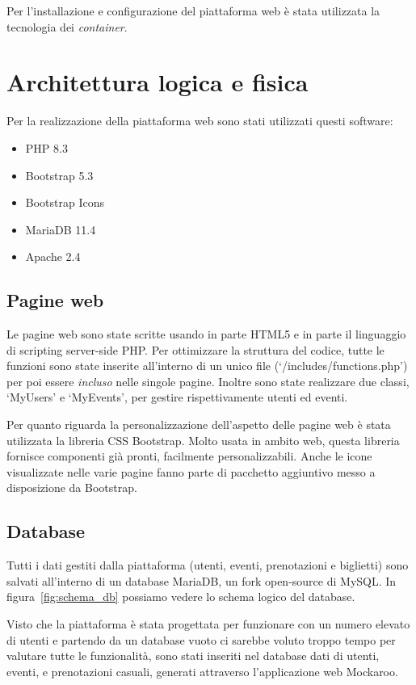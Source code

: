 \documentclass[italian,12pt,a4paper,oneside,final]{report}
\begin{document}
Per l’installazione e configurazione del piattaforma web è stata utilizzata la tecnologia dei \textit{container}.
\newpage
\section{Architettura logica e fisica}
Per la realizzazione della piattaforma web sono stati utilizzati questi software:

\begin{itemize}
	\item PHP 8.3
	\item Bootstrap 5.3
	\item Bootstrap Icons
	\item MariaDB 11.4
	\item Apache 2.4
\end{itemize}

\subsection{Pagine web}
Le pagine web sono state scritte usando in parte HTML5 e in parte il linguaggio di scripting server-side PHP.
Per ottimizzare la struttura del codice, tutte le funzioni sono state inserite all'interno di un unico file \mbox{(`/includes/functions.php')} per poi essere \textit{incluso} nelle singole pagine. 
Inoltre sono state realizzare due classi, `MyUsers' e `MyEvents', per gestire rispettivamente utenti ed eventi.

Per quanto riguarda la personalizzazione dell'aspetto delle pagine web è stata utilizzata la libreria CSS Bootstrap.
Molto usata in ambito web, questa libreria fornisce componenti già pronti, facilmente personalizzabili.
Anche le icone visualizzate nelle varie pagine fanno parte di pacchetto aggiuntivo messo a disposizione da Bootstrap. 

\subsection{Database}
Tutti i dati gestiti dalla piattaforma (utenti, eventi, prenotazioni e biglietti) sono salvati all'interno di un database MariaDB, un fork open-source di MySQL.
In figura~\ref{fig:schema_db} possiamo vedere lo schema logico del database.

Visto che la piattaforma è stata progettata per funzionare con un numero elevato di utenti e partendo da un database vuoto ci sarebbe voluto troppo tempo per valutare tutte le funzionalità, sono stati inseriti nel database dati di utenti, eventi, e prenotazioni casuali, generati attraverso l’applicazione web Mockaroo.
\end{document}
